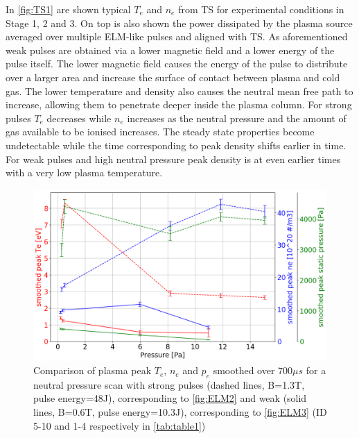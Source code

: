 In \autoref{fig:TS1} are shown typical $T_e$ and $n_e$ from TS for experimental conditions in Stage 1, 2 and 3. On top is also shown the power dissipated by the plasma source averaged over multiple ELM-like pulses and aligned with TS. As aforementioned weak pulses are obtained via a lower magnetic field and a lower energy of the pulse itself. The lower magnetic field causes the energy of the pulse to distribute over a larger area and increase the surface of contact between plasma and cold gas. The lower temperature and density also causes the neutral mean free path to increase, allowing them to penetrate deeper inside the plasma column. For strong pulses $T_e$ decreases while $n_e$ increases as the neutral pressure and the amount of gas available to be ionised increases. The steady state properties become undetectable while the time corresponding to peak density shifts earlier in time. For weak pulses and high neutral pressure peak density is at even earlier times with a very low plasma temperature.

\begin{figure}[!ht]
	\centering
	\includegraphics[width=0.7\linewidth,trim={0 0 0 0},clip]{Chapters/chapter3/figs/pure_TS_compare2.png}
	\caption{Comparison of plasma peak $T_e$, $n_e$ and $p_e$ smoothed over $700 \mu s$ for a neutral pressure scan with strong pulses (dashed lines, B=1.3T, pulse energy=48J), corresponding to \autoref{fig:ELM2} and weak (solid lines, B=0.6T, pulse energy=10.3J), corresponding to \autoref{fig:ELM3} (ID 5-10 and 1-4 respectively in \autoref{tab:table1})}
	\label{fig:TS2}
\end{figure}

